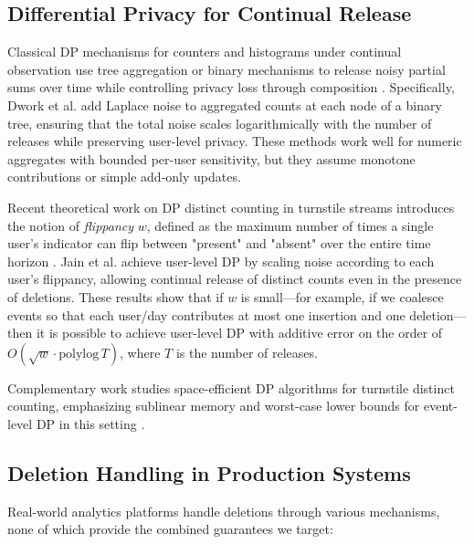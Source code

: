 \documentclass[11pt]{article}
\begin{document}
\subsection{Differential Privacy for Continual Release}

Classical DP mechanisms for counters and histograms under continual observation use tree aggregation or binary mechanisms to release noisy partial sums over time while controlling privacy loss through composition \cite{dwork2010differential}. Specifically, Dwork et al. add Laplace noise to aggregated counts at each node of a binary tree, ensuring that the total noise scales logarithmically with the number of releases while preserving user-level privacy. These methods work well for numeric aggregates with bounded per-user sensitivity, but they assume monotone contributions or simple add-only updates.

Recent theoretical work on DP distinct counting in turnstile streams introduces the notion of \emph{flippancy} $w$, defined as the maximum number of times a single user's indicator can flip between "present" and "absent" over the entire time horizon \cite{jain2023counting}. Jain et al. achieve user-level DP by scaling noise according to each user's flippancy, allowing continual release of distinct counts even in the presence of deletions. These results show that if $w$ is small---for example, if we coalesce events so that each user/day contributes at most one insertion and one deletion---then it is possible to achieve user-level DP with additive error on the order of $O(\sqrt{w} \cdot \text{polylog}\, T)$, where $T$ is the number of releases.

Complementary work studies space-efficient DP algorithms for turnstile distinct counting, emphasizing sublinear memory and worst-case lower bounds for event-level DP in this setting \cite{cummings2025differentially}.

\subsection{Deletion Handling in Production Systems}

Real-world analytics platforms handle deletions through various mechanisms, none of which provide the combined guarantees we target:
\end{document}
